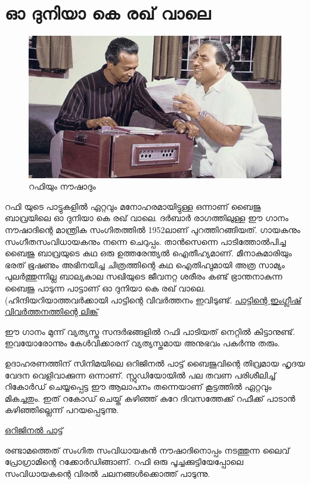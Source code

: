 \documentclass[10pt,a4paper]{report}
\begin{document}
\section{ ഓ ദുനിയാ കെ രഖ് വാലെ}
\begin{figure}[htb]
\begin{center}
\includegraphics[scale=.4]{images/rafi.jpg}
\caption{ റഫിയും നൗഷാദും  }
\end{center}
\end{figure}
റഫി യുടെ പാട്ടുകളിൽ ഏറ്റവും മനോഹരമായിട്ടുള്ള ഒന്നാണ് ബൈജു ബാവ്രയിലെ ഓ ദുനിയാ കെ രഖ് വാലെ. ദർബാർ രാഗത്തിലുള്ള ഈ ഗാനം നൗഷാദിന്റെ മാന്ത്രിക സംഗിതത്തിൽ 1952ലാണ് പുറത്തിറങ്ങിയത്. ഗായകനും സംഗീതസംവിധായകനും നന്നെ ചെറുപ്പം. താൻസെന്നെ പാടിത്തോൽപിച്ച ബൈജു ബാവ്രയുടെ കഥ ഒരു ഉത്തരേന്ത്യൽ ഐതീഹ്യമാണ്. മീനാകുമാരിയും ഭരത് ഭൂഷണും അഭിനയിച്ച ചിത്രത്തിന്റെ കഥ ഐതിഹ്വുമായി അത്ര സാമ്യം പുലർത്തുന്നില്ല
ബാല്യകാല സഖിയുടെ ജീവനറ്റ ശരീരം കണ്ട് ഭ്രാന്തനാകുന്ന ബൈജു പാടുന്ന പാട്ടാണ് ഓ ദുനിയാ കെ രഖ് വാലെ. (ഹിന്ദിയറിയാത്തവർക്കായി പാട്ടിന്റെ വിവർത്തനം ഇവിടുണ്ട്.
\href{http://www.ardhamy.com/song/o-duniya-ke-rakhwale}{പാട്ടിന്റെ ഇംഗ്ലീഷ് വിവർത്തനത്തിന്റെ ലിങ്ക്}

ഈ ഗാനം മുന്ന് വ്യത്യസ്ത സന്ദർഭങ്ങളിൽ റഫി പാടിയത് നെറ്റിൽ കിട്ടാനുണ്ട്. ഇവയോരോന്നും കേൾവിക്കാരന് വ്യത്യസ്തമായ അനുഭവം പകർന്നു തരും.

ഉദാഹരണത്തിന് സിനിമയിലെ ഒറിജിനൽ പാട്ട് ബൈജുവിന്റെ തിവ്രമായ ഹൃദയ വേദന വെളിവാക്കുന്ന ഒന്നാണ്. സ്റ്റുഡിയോയിൽ പല തവണ പരിശീലിച്ച് റികോർഡ് ചെയ്യപ്പെട്ട ഈ ആലാപനം തന്നെയാണ് കൂട്ടത്തിൽ ഏറ്റവും മികച്ചതും. ഇത് റകോഡ് ചെയ്ത് കഴിഞ്ഞ് കുറേ ദിവസത്തേക്ക് റഫീക്ക് പാടാൻ കഴിഞ്ഞില്ലെന്ന് പറയപ്പെടുന്നു.

\href{https://youtu.be/ReFDB8cexLg}{ഒറിജിനൽ പാട്ട്}

രണ്ടാമത്തെത് സംഗിത സംവിധായകൻ നൗഷാദിനൊപ്പം നടത്തുന്ന ലൈവ് പ്രോഗ്രാമിന്റെ റക്കോർഡിങ്ങാണ്. റഫി ഒരു പൂച്ചക്കുട്ടിയേപ്പോലെ സംവിധായകന്റെ വിരൽ ചലനങ്ങൾക്കൊത്ത് പാടുന്നു.
\end{document}

